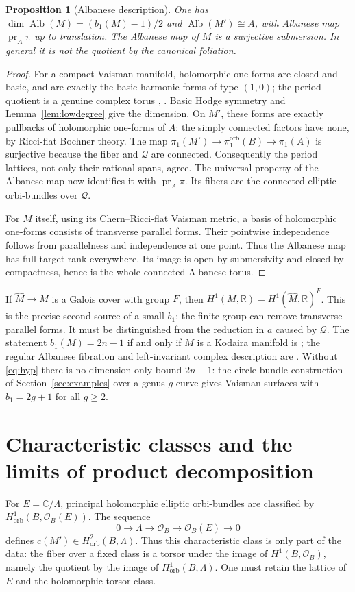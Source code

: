 \documentclass[12pt]{amsart}
\newtheorem{prop}[thm]{Proposition}
\theoremstyle{definition}
\theoremstyle{remark}
\numberwithin{equation}{section}
\newcommand{\cO}{\mathcal{O}}
\DeclareMathOperator{\pr}{pr}
\DeclareMathOperator{\Alb}{Alb}
\newcommand{\orb}{\mathrm{orb}}
\newcommand{\R}{\mathbb{R}}
\newcommand{\C}{\mathbb{C}}
\newcommand{\Qfac}{\mathcal{Q}}
\begin{document}
\begin{prop}[Albanese description]\label{prop:alb}
One has $\dim\Alb(M)=(b_1(M)-1)/2$ and
$\Alb(M')\cong A$, with Albanese map $\pr_A\pi$ up to translation.
The Albanese map of $M$ is a surjective submersion. In general it is
not the quotient by the canonical foliation.
\end{prop}
\begin{proof}
For a compact Vaisman manifold, holomorphic one-forms are closed and
basic, and are exactly the basic harmonic forms of type $(1,0)$;
the period quotient is a genuine complex torus
\cite[Sections 2--3, Theorem 3.3]{Gomes}, \cite[Section 3]{IO}.
Basic Hodge symmetry and Lemma~\ref{lem:lowdegree} give the dimension.
On $M'$, these forms are exactly pullbacks of holomorphic one-forms
of $A$: the simply connected factors have none, by Ricci-flat Bochner
theory. The map $\pi_1(M')\to\pi_1^{\orb}(B)\to\pi_1(A)$ is
surjective because the fiber and $\Qfac$ are connected. Consequently
the period lattices, not only their rational spans, agree. The universal
property of the Albanese map now identifies it with $\pr_A\pi$.
Its fibers are the connected elliptic orbi-bundles over $\Qfac$.

For $M$ itself, using its Chern--Ricci-flat Vaisman metric, a basis of
holomorphic one-forms consists of transverse parallel forms. Their
pointwise independence follows from parallelness and independence at
one point. Thus the Albanese map has full target rank everywhere. Its
image is open by submersivity and closed by compactness, hence is the
whole connected Albanese torus.
\end{proof}

If $\widehat M\to M$ is a Galois cover with group $F$, then
$H^1(M,\R)=H^1(\widehat M,\R)^F$. This is the precise second source
of a small $b_1$: the finite group can remove transverse parallel forms.
It must be distinguished from the reduction in $a$ caused by $\Qfac$.
The statement $b_1(M)=2n-1$ if and only if $M$ is a Kodaira manifold
is \cite[Corollary 5.11]{Istrati}; the regular Albanese fibration and
left-invariant complex description are \cite[Theorems 1.1, 6.6]{Gomes}.
Without \eqref{eq:hyp} there is no dimension-only bound $2n-1$:
the circle-bundle construction of Section~\ref{sec:examples} over a
genus-$g$ curve gives Vaisman surfaces with $b_1=2g+1$ for all $g\geq2$.

\section{Characteristic classes and the limits of product decomposition}
\label{sec:twist}
For $E=\C/\Lambda$, principal holomorphic elliptic orbi-bundles are
classified by $H^1_{\orb}(B,\cO_B(E))$. The sequence
\begin{equation}\label{eq:exp}
0\longrightarrow\Lambda\longrightarrow\cO_B\longrightarrow
\cO_B(E)\longrightarrow0
\end{equation}
defines $c(M')\in H^2_{\orb}(B,\Lambda)$. Thus this characteristic
class is only part of the data: the fiber over a fixed class is a torsor
under the image of $H^1(B,\cO_B)$, namely the quotient by the image
of $H^1_{\orb}(B,\Lambda)$. One must retain the lattice of $E$ and
the holomorphic torsor class.
\end{document}
